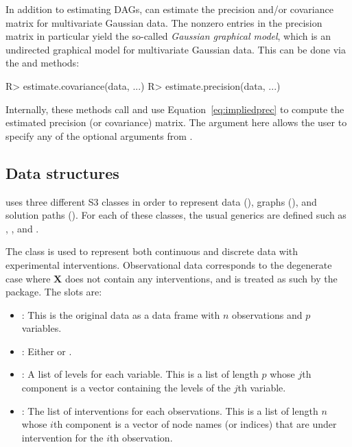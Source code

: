\documentclass[article]{jss}
\newcommand{\samplemat}{\mathbf{X}}
\renewcommand{\|}{\,|\,}
\begin{document}
In addition to estimating DAGs,  can estimate the precision and/or covariance matrix for multivariate Gaussian data. The nonzero entries in the precision matrix in particular yield the so-called \emph{Gaussian graphical model}, which is an undirected graphical model for multivariate Gaussian data. This can be done via the  and  methods:
%
\begin{CodeChunk}
\begin{CodeInput}
R> estimate.covariance(data, ...)
R> estimate.precision(data, ...)
\end{CodeInput}
\end{CodeChunk}
%
Internally, these methods call  and use Equation~\ref{eq:impliedprec} to compute the estimated precision (or covariance) matrix. The  argument here allows the user to specify any of the optional arguments from .

\subsection{Data structures}
\label{subsec:ds}

 uses three different S3 classes in order to represent data (), graphs (), and solution paths (). For each of these classes, the usual generics are defined such as , , and .

The  class is used to represent both continuous and discrete data with experimental interventions. Observational data corresponds to the degenerate case where $\samplemat$ does not contain any interventions, and is treated as such by the  package. The slots are:
\begin{itemize}
\item {}: This is the original data as a data frame with $n$ observations and $p$ variables.
\item {}: Either  or .
\item {}: A list of levels for each variable. This is a list of length $p$ whose $j$th component is a vector containing the levels of the $j$th variable.
\item {}: The list of interventions for each observations. This is a list of length $n$ whose $i$th component is a vector of node names (or indices) that are under intervention for the $i$th observation.
\end{itemize}
\end{document}
